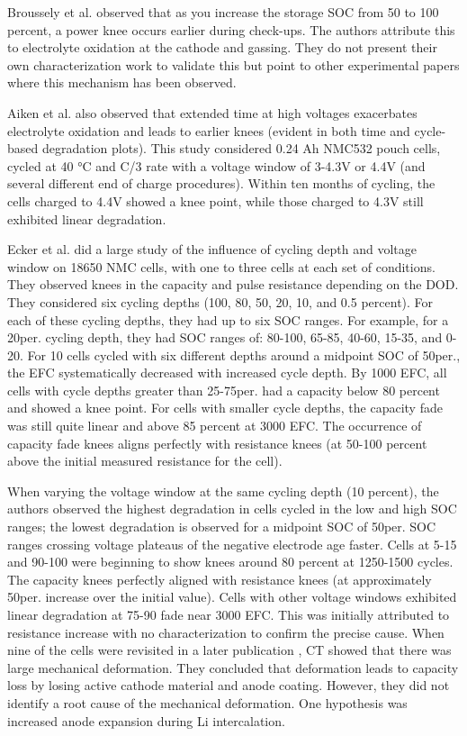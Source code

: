 \documentclass{article}
\begin{document}
Broussely et al. \cite{broussely_main_2005} observed that as you increase the storage SOC from 50 to 100 percent, a power knee occurs earlier during check-ups. The authors attribute this to electrolyte oxidation at the cathode and gassing. They do not present their own characterization work to validate this but point to other experimental papers where this mechanism has been observed.

Aiken et al. \cite{aiken_accelerated_2020} also observed that extended time at high voltages exacerbates electrolyte oxidation and leads to earlier knees (evident in both time and cycle-based degradation plots). This study considered 0.24 Ah NMC532 pouch cells, cycled at 40 °C and C/3 rate with a voltage window of 3-4.3V or 4.4V (and several different end of charge procedures). Within ten months of cycling, the cells charged to 4.4V showed a knee point, while those charged to 4.3V still exhibited linear degradation.

Ecker et al. \cite{ecker_calendar_2014} did a large study of the influence of cycling depth and voltage window on 18650 NMC cells, with one to three cells at each set of conditions. They observed knees in the capacity and pulse resistance depending on the DOD. They considered six cycling depths (100, 80, 50, 20, 10, and 0.5 percent). For each of these cycling depths, they had up to six SOC ranges. For example, for a 20per. cycling depth, they had SOC ranges of: 80-100, 65-85, 40-60, 15-35, and 0-20. For 10 cells cycled with six different depths around a midpoint SOC of 50per., the EFC systematically decreased with increased cycle depth. By 1000 EFC, all cells with cycle depths greater than 25-75per. had a capacity below 80 percent and showed a knee point. For cells with smaller cycle depths, the capacity fade was still quite linear and above 85 percent at 3000 EFC. The occurrence of capacity fade knees aligns perfectly with resistance knees (at 50-100 percent above the initial measured resistance for the cell). 

When varying the voltage window at the same cycling depth (10 percent), the authors observed the highest degradation in cells cycled in the low and high SOC ranges; the lowest degradation is observed for a midpoint SOC of 50per. SOC ranges crossing voltage plateaus of the negative electrode age faster. Cells at 5-15 and 90-100 were beginning to show knees around 80 percent at 1250-1500 cycles. The capacity knees perfectly aligned with resistance knees (at approximately 50per. increase over the initial value). Cells with other voltage windows exhibited linear degradation at 75-90 fade near 3000 EFC. This was initially attributed to resistance increase with no characterization to confirm the precise cause. When nine of the cells were revisited in a later publication \cite{pfrang_long-term_2018}, CT showed that there was large mechanical deformation.  They concluded that deformation leads to capacity loss by losing active cathode material and anode coating. However, they did not identify a root cause of the mechanical deformation. One hypothesis was increased anode expansion during Li intercalation. 
\end{document}
